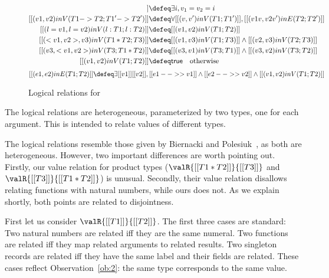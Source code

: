 \begin{figure}[t]
  \centering
\begin{align*}
  [[(v1 , v2) in V ( nat ; nat )]] &\defeq \exists i, v_1 = v_2 = i \\
  [[(v1, v2) in V (T1 -> T2 ; T1' -> T2')]] &\defeq \forall [[(v, v') in V (T1 ; T1')]], [[(v1 v, v2 v') in E (T2 ; T2')]] \\
  [[( {l = v1} , {l = v2}) in V ( {l : T1} ; { l : T2 } )]] &\defeq [[(v1, v2) in V (T1; T2)]] \\
  [[(<v1, v2> , v3) in V (T1 * T2 ; T3)]] &\defeq [[(v1, v3) in V (T1; T3)]] \land [[(v2, v3) in V (T2; T3)]] \\
  [[(v3, <v1, v2> ) in V (T3; T1 * T2)]] &\defeq [[(v3, v1) in V (T3; T1)]] \land [[(v3, v2) in V (T3; T2)]] \\
  [[(v1 , v2) in V (T1; T2)]]  &\defeq \mathsf{true} \quad \text{otherwise}
\end{align*}
\[
  [[(e1, e2) in E (T1; T2)]] \defeq \exists [[v1]] [[v2]], [[e1 -->> v1]] \land [[e2 -->> v2]] \land [[(v1, v2) in V (T1; T2)]]
\]
  \caption{Logical relations for \tname}
  \label{fig:logical}
\end{figure}


\begin{remark}
  The logical relations are heterogeneous, parameterized by two types, one for
  each argument. This is intended to relate values of different types.
\end{remark}


\begin{remark}
  The logical relations resemble those given by Biernacki and Polesiuk~\cite{biernacki2015logical}, as
  both are heterogeneous. However, two important differences are worth pointing
  out. Firstly, our value relation for product types ($\valR{[[T1 * T2]]}{[[T3]]}$ and $\valR{[[T3]]}{[[T1 * T2]]}$) is unusual.
  Secondly, their value relation disallows relating functions with natural numbers, while
  ours does not. As we explain shortly, both points are related to disjointness.
\end{remark}


First let us consider $\valR{[[T1]]}{[[T2]]}$. The first three cases are
standard: Two natural numbers are related iff they are the same numeral. Two
functions are related iff they map related arguments to related results. Two
singleton records are related iff they have the same label and their fields are
related. These cases reflect Observation~\ref{ob:2}: the same type
corresponds to the same value.

